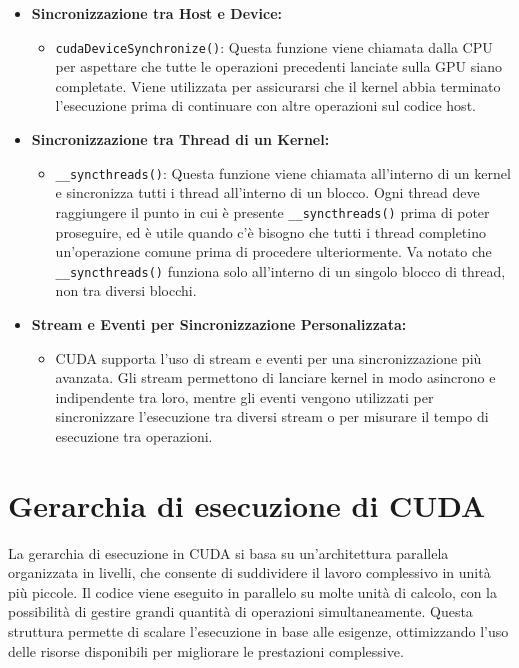 \documentclass[12pt,a4paper]{report}
\begin{document}
\begin{itemize}
    \item \textbf{Sincronizzazione tra Host e Device:}
    \begin{itemize}
        \item \texttt{cudaDeviceSynchronize()}: Questa funzione viene chiamata dalla CPU per aspettare che tutte le operazioni precedenti lanciate sulla GPU siano completate. Viene utilizzata per assicurarsi che il kernel abbia terminato l'esecuzione prima di continuare con altre operazioni sul codice host.
    \end{itemize}
    
    \item \textbf{Sincronizzazione tra Thread di un Kernel:}
    \begin{itemize}
        \item \texttt{\_\_syncthreads()}: Questa funzione viene chiamata all'interno di un kernel e sincronizza tutti i thread all'interno di un blocco. Ogni thread deve raggiungere il punto in cui è presente \texttt{\_\_syncthreads()} prima di poter proseguire, ed è utile quando c'è bisogno che tutti i thread completino un’operazione comune prima di procedere ulteriormente. Va notato che \texttt{\_\_syncthreads()} funziona solo all'interno di un singolo blocco di thread, non tra diversi blocchi.
    \end{itemize}
    
    \item \textbf{Stream e Eventi per Sincronizzazione Personalizzata:}
    \begin{itemize}
        \item CUDA supporta l'uso di stream e eventi per una sincronizzazione più avanzata. Gli stream permettono di lanciare kernel in modo asincrono e indipendente tra loro, mentre gli eventi vengono utilizzati per sincronizzare l'esecuzione tra diversi stream o per misurare il tempo di esecuzione tra operazioni.
    \end{itemize}
\end{itemize}

\section{Gerarchia di esecuzione di CUDA}

La gerarchia di esecuzione in CUDA si basa su un'architettura parallela organizzata in livelli, che consente di suddividere il lavoro complessivo in unità più piccole. Il codice viene eseguito in parallelo su molte unità di calcolo, con la possibilità di gestire grandi quantità di operazioni simultaneamente. Questa struttura permette di scalare l'esecuzione in base alle esigenze, ottimizzando l'uso delle risorse disponibili per migliorare le prestazioni complessive.
\end{document}
